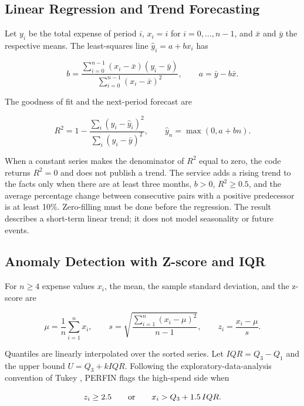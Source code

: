 \subsection{Linear Regression and Trend Forecasting}

Let $y_i$ be the total expense of period $i$, $x_i=i$ for
$i=0,\ldots,n-1$, and $\bar{x}$ and $\bar{y}$ the respective means. The
least-squares line $\hat y_i=a+bx_i$ has \cite{montgomery2012}

\begin{equation}
  b=\frac{\sum_{i=0}^{n-1}(x_i-\bar{x})(y_i-\bar{y})}
          {\sum_{i=0}^{n-1}(x_i-\bar{x})^2},\qquad
  a=\bar{y}-b\bar{x}.
\end{equation}

The goodness of fit and the next-period forecast are

\begin{equation}
  R^2=1-\frac{\sum_i(y_i-\hat y_i)^2}
                 {\sum_i(y_i-\bar y)^2},\qquad
  \hat y_n=\max(0,a+bn).
\end{equation}

When a constant series makes the denominator of $R^2$ equal to zero, the
code returns $R^2=0$ and does not publish a trend. The service adds a
rising trend to the facts only when there are at least three months,
$b>0$, $R^2\geq0.5$, and the average percentage change between
consecutive pairs with a positive predecessor is at least 10\%.
Zero-filling must be done before the regression. The result describes a
short-term linear trend; it does not model seasonality or future events.

\subsection{Anomaly Detection with Z-score and IQR}

For $n\geq4$ expense values $x_i$, the mean, the sample standard
deviation, and the z-score are

\begin{equation}
  \mu=\frac{1}{n}\sum_{i=1}^{n}x_i,\qquad
  s=\sqrt{\frac{\sum_{i=1}^{n}(x_i-\mu)^2}{n-1}},\qquad
  z_i=\frac{x_i-\mu}{s}.
\end{equation}

Quantiles are linearly interpolated over the sorted series. Let
$IQR=Q_3-Q_1$ and the upper bound $U=Q_3+kIQR$. Following the
exploratory-data-analysis convention of Tukey \cite{tukey1977}, PERFIN
flags the high-spend side when

\begin{equation}
  z_i\geq2.5\qquad\hbox{or}\qquad x_i>Q_3+1.5\,IQR.
\end{equation}

